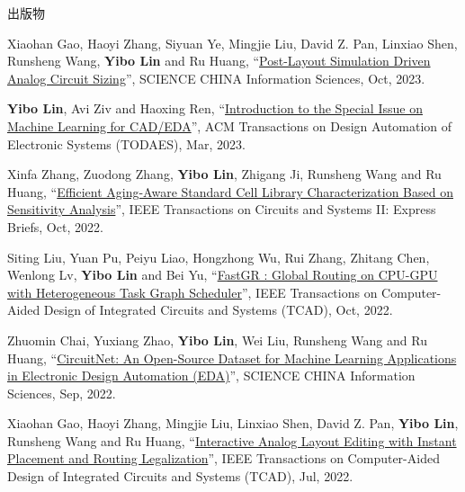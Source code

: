 \begin{rSection}{出版物}
\begin{description}[font=\normalfont, rightmargin=2em]
{}
            

\item[{[J41]}]{
        Xiaohan Gao, Haoyi Zhang, Siyuan Ye, Mingjie Liu, David Z. Pan, Linxiao Shen, Runsheng Wang, \textbf{Yibo Lin} and Ru Huang, 
    ``\href{https://doi.org/10.1007/s11432-022-3878-5}{Post-Layout Simulation Driven Analog Circuit Sizing}'', 
    SCIENCE CHINA Information Sciences, Oct, 2023.
    
}
            

\item[{[J40]}]{
        \textbf{Yibo Lin}, Avi Ziv and Haoxing Ren, 
    ``\href{https://doi.org/10.1145/3586208}{Introduction to the Special Issue on Machine Learning for CAD/EDA}'', 
    ACM Transactions on Design Automation of Electronic Systems (TODAES), Mar, 2023.
    
}
            

\item[{[J39]}]{
        Xinfa Zhang, Zuodong Zhang, \textbf{Yibo Lin}, Zhigang Ji, Runsheng Wang and Ru Huang, 
    ``\href{https://doi.org/10.1109/TCSII.2022.3212123}{Efficient Aging-Aware Standard Cell Library Characterization Based on Sensitivity Analysis}'', 
    IEEE Transactions on Circuits and Systems II: Express Briefs, Oct, 2022.
    
}
            

\item[{[J38]}]{
        Siting Liu, Yuan Pu, Peiyu Liao, Hongzhong Wu, Rui Zhang, Zhitang Chen, Wenlong Lv, \textbf{Yibo Lin} and Bei Yu, 
    ``\href{https://doi.org/10.1109/TCAD.2022.3217668}{FastGR : Global Routing on CPU-GPU with Heterogeneous Task Graph Scheduler}'', 
    IEEE Transactions on Computer-Aided Design of Integrated Circuits and Systems (TCAD), Oct, 2022.
    
}
            

\item[{[J37]}]{
        Zhuomin Chai, Yuxiang Zhao, \textbf{Yibo Lin}, Wei Liu, Runsheng Wang and Ru Huang, 
    ``\href{https://www.sciengine.com/SCIS/doi/10.1007/s11432-022-3571-8}{CircuitNet: An Open-Source Dataset for Machine Learning Applications in Electronic Design Automation (EDA)}'', 
    SCIENCE CHINA Information Sciences, Sep, 2022.
    
}
            

\item[{[J36]}]{
        Xiaohan Gao, Haoyi Zhang, Mingjie Liu, Linxiao Shen, David Z. Pan, \textbf{Yibo Lin}, Runsheng Wang and Ru Huang, 
    ``\href{https://doi.org/10.1109/TCAD.2022.3190234}{Interactive Analog Layout Editing with Instant Placement and Routing Legalization}'', 
    IEEE Transactions on Computer-Aided Design of Integrated Circuits and Systems (TCAD), Jul, 2022.
    
}
\end{description}
\end{rSection}
